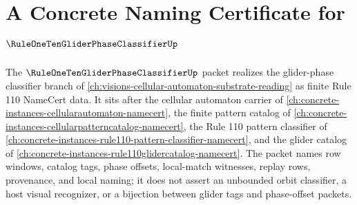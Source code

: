 \chapter{A Concrete Naming Certificate for $\RuleOneTenGliderPhaseClassifierUp$}
\label{ch:concrete-instances-rule110-glider-phase-classifier-namecert}

The $\RuleOneTenGliderPhaseClassifierUp$ packet realizes the glider-phase classifier branch of \autoref{ch:visions-cellular-automaton-substrate-reading} as finite Rule 110 NameCert data. It sits after the cellular automaton carrier of \autoref{ch:concrete-instances-cellularautomaton-namecert}, the finite pattern catalog of \autoref{ch:concrete-instances-cellularpatterncatalog-namecert}, the Rule 110 pattern classifier of \autoref{ch:concrete-instances-rule110-pattern-classifier-namecert}, and the glider catalog of \autoref{ch:concrete-instances-rule110glidercatalog-namecert}. The packet names row windows, catalog tags, phase offsets, local-match witnesses, replay rows, provenance, and local naming; it does not assert an unbounded orbit classifier, a host visual recognizer, or a bijection between glider tags and phase-offset packets.



